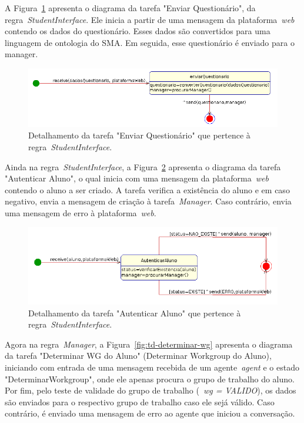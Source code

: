 A Figura~\ref{fig:td-enviar-quest} apresenta o diagrama da tarefa "Enviar Questionário", da regra~\emph{StudentInterface}. Ele inicia a partir de uma mensagem da plataforma~\emph{web} contendo os dados do questionário. Esses dados são convertidos para uma linguagem de ontologia do SMA. Em seguida, esse questionário é enviado para o manager.

\begin{figure}
	\centering
	\includegraphics[scale=0.48]{images/td-enviar-quest.png}
	\caption{Detalhamento da tarefa "Enviar Questionário" que pertence à regra~\emph{StudentInterface}.}
	\label{fig:td-enviar-quest}
\end{figure}

Ainda na regra~\emph{StudentInterface}, a Figura~\ref{fig:td-autenticar-aluno} apresenta o diagrama da tarefa "Autenticar Aluno", o qual inicia com uma mensagem da plataforma~\emph{web} contendo o aluno a ser criado. A tarefa verifica a existência do aluno e em caso negativo, envia a mensagem de criação à tarefa~\emph{Manager}. Caso contrário, envia uma mensagem de erro à plataforma~\emph{web}.

\begin{figure}
	\centering
	\includegraphics[scale=0.48]{images/td-autenticar-aluno.png}
	\caption{Detalhamento da tarefa "Autenticar Aluno" que pertence à regra~\emph{StudentInterface}.}
	\label{fig:td-autenticar-aluno}
\end{figure}

Agora na regra~\emph{Manager}, a Figura~\ref{fig:td-determinar-wg} apresenta o diagrama da tarefa "Determinar WG do Aluno" (Determinar Workgroup do Aluno), iniciando com entrada de uma mensagem recebida de um agente~\emph{agent} e o estado "DeterminarWorkgroup", onde ele apenas procura o grupo de trabalho do aluno. Por fim, pelo teste de validade do grupo de trabalho (~\emph{wg = VALIDO}), os dados são enviados para o respectivo grupo de trabalho caso ele sejá válido. Caso contrário, é enviado uma mensagem de erro ao agente que iniciou a conversação.

